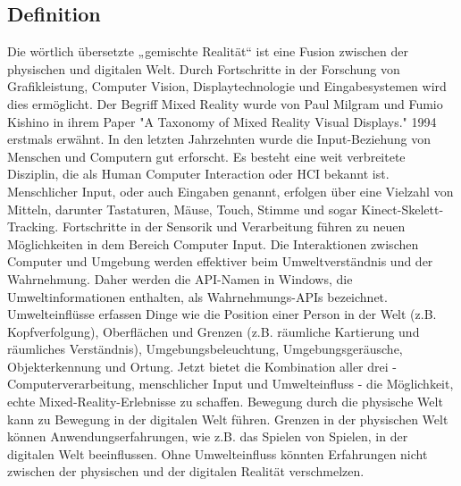 \subsection{Definition}
Die wörtlich übersetzte „gemischte Realität“ ist eine Fusion zwischen der physischen und digitalen Welt. Durch Fortschritte in der Forschung von Grafikleistung, Computer Vision, Displaytechnologie und Eingabesystemen wird dies ermöglicht. Der Begriff Mixed Reality wurde von Paul Milgram und Fumio Kishino in ihrem Paper "A Taxonomy of Mixed Reality Visual Displays." 1994 erstmals erwähnt. 
In den letzten Jahrzehnten wurde die Input-Beziehung von Menschen und Computern gut erforscht. Es besteht eine weit verbreitete Disziplin, die als Human Computer Interaction oder HCI bekannt ist. Menschlicher Input, oder auch Eingaben genannt, erfolgen über eine Vielzahl von Mitteln, darunter Tastaturen, Mäuse, Touch, Stimme und sogar Kinect-Skelett-Tracking.
Fortschritte in der Sensorik und Verarbeitung führen zu neuen Möglichkeiten in dem Bereich Computer Input. Die Interaktionen zwischen Computer und Umgebung werden effektiver beim Umweltverständnis und der Wahrnehmung. Daher werden die API-Namen in Windows, die Umweltinformationen enthalten, als Wahrnehmungs-APIs bezeichnet. Umwelteinflüsse erfassen Dinge wie die Position einer Person in der Welt (z.B. Kopfverfolgung), Oberflächen und Grenzen (z.B. räumliche Kartierung und räumliches Verständnis), Umgebungsbeleuchtung, Umgebungsgeräusche, Objekterkennung und Ortung.
Jetzt bietet die Kombination aller drei - Computerverarbeitung, menschlicher Input und Umwelteinfluss - die Möglichkeit, echte Mixed-Reality-Erlebnisse zu schaffen. Bewegung durch die physische Welt kann zu Bewegung in der digitalen Welt führen. Grenzen in der physischen Welt können Anwendungserfahrungen, wie z.B. das Spielen von Spielen, in der digitalen Welt beeinflussen. Ohne Umwelteinfluss könnten Erfahrungen nicht zwischen der physischen und der digitalen Realität verschmelzen.

